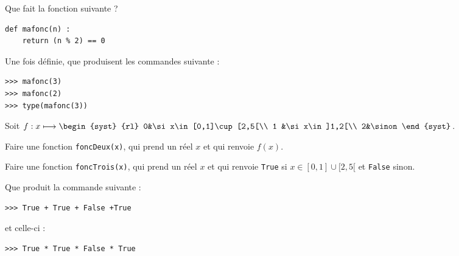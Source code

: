 \begin{enonce}
\ques Que fait la fonction suivante ?

\begin{verbatim}
def mafonc(n) :
    return (n % 2) == 0
\end{verbatim}    

\ques Une fois définie, que produisent les commandes suivante :
\begin{verbatim}
>>> mafonc(3)
>>> mafonc(2)
>>> type(mafonc(3))
\end{verbatim}

\ques Soit $f : x\lmt \begin{syst}
{rl}
0&\si x\in [0,1]\cup[2,5[\\
1 &\si x\in ]1,2[\\
2&\sinon
\end{syst}$.

Faire une fonction \texttt{foncDeux(x)}, qui prend un réel $x$ et qui renvoie $f(x)$.

\ques Faire une fonction \texttt{foncTrois(x)}, qui prend un réel $x$ et qui renvoie \texttt{True} si $x\in [0,1]\cup[2,5[$ et \texttt{False} sinon.

\ques Que produit la commande suivante :
\begin{verbatim}
>>> True + True + False +True
\end{verbatim}
et celle-ci :
\begin{verbatim}
>>> True * True * False * True
\end{verbatim}


\end{enonce}

\begin{correction}

\end{correction}


\exo

